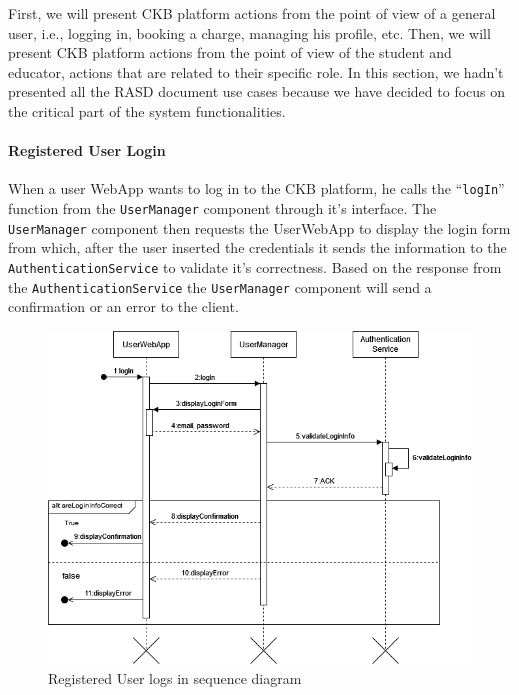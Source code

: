 First, we will present CKB platform actions from the point of view of a general user, i.e., logging in, booking a charge, managing his profile, etc.
Then, we will present CKB platform actions from the point of view of the student and educator, actions that are related to their specific role.
In this section, we hadn't presented all the RASD document use cases because we have decided to focus on the critical part of the system functionalities.

\paragraph{Registered User Login}
When a user WebApp wants to log in to the CKB platform, he calls the ``\verb|logIn|'' function from the \verb|UserManager| component through it's interface.
The \verb|UserManager| component then requests the UserWebApp to display the login form from which, after the user inserted the credentials it sends the information to the
\verb|AuthenticationService| to validate it's correctness. Based on the response from the \verb|AuthenticationService| the \verb|UserManager| component will send a confirmation or an error to the client.

\begin{figure}[H]
    \begin{center}
        \includegraphics[width=\linewidth]{Images/sequence/Sd_login.png}
        \caption{Registered User logs in sequence diagram}
        \label{fig:user_logs_in}
    \end{center}
\end{figure}


